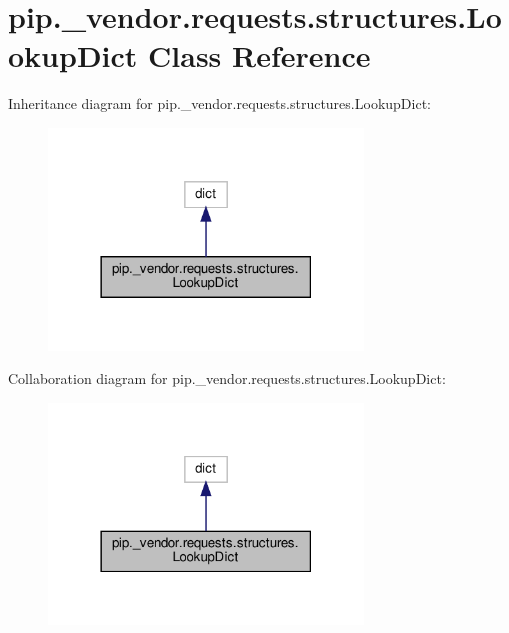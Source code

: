 \hypertarget{classpip_1_1__vendor_1_1requests_1_1structures_1_1LookupDict}{}\section{pip.\+\_\+vendor.\+requests.\+structures.\+Lookup\+Dict Class Reference}
\label{classpip_1_1__vendor_1_1requests_1_1structures_1_1LookupDict}


Inheritance diagram for pip.\+\_\+vendor.\+requests.\+structures.\+Lookup\+Dict\+:
\nopagebreak
\begin{figure}[H]
\begin{center}
\leavevmode
\includegraphics[width=237pt]{classpip_1_1__vendor_1_1requests_1_1structures_1_1LookupDict__inherit__graph}
\end{center}
\end{figure}


Collaboration diagram for pip.\+\_\+vendor.\+requests.\+structures.\+Lookup\+Dict\+:
\nopagebreak
\begin{figure}[H]
\begin{center}
\leavevmode
\includegraphics[width=237pt]{classpip_1_1__vendor_1_1requests_1_1structures_1_1LookupDict__coll__graph}
\end{center}
\end{figure}
